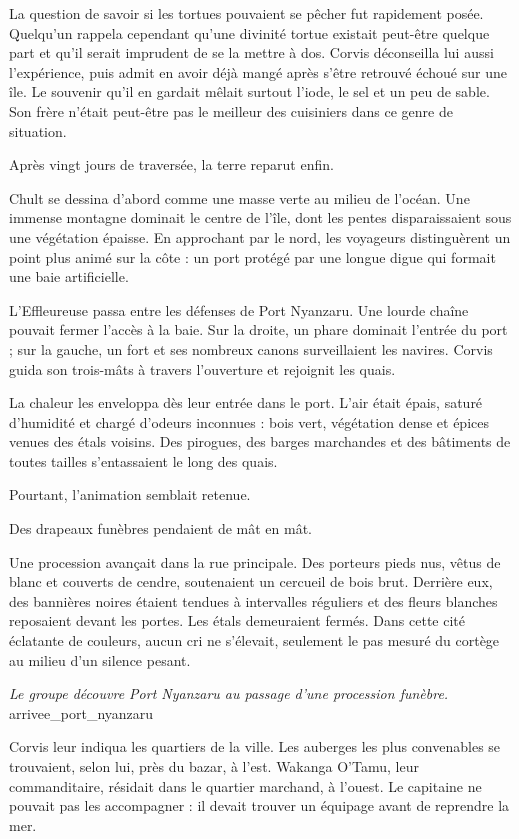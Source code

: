 La question de savoir si les tortues pouvaient se pêcher fut rapidement posée. Quelqu'un rappela cependant qu'une divinité tortue existait peut-être quelque part et qu'il serait imprudent de se la mettre à dos. Corvis déconseilla lui aussi l'expérience, puis admit en avoir déjà mangé après s'être retrouvé échoué sur une île. Le souvenir qu'il en gardait mêlait surtout l'iode, le sel et un peu de sable. Son frère n'était peut-être pas le meilleur des cuisiniers dans ce genre de situation.

Après vingt jours de traversée, la terre reparut enfin.

\scenebreak

Chult se dessina d'abord comme une masse verte au milieu de l'océan. Une immense montagne dominait le centre de l'île, dont les pentes disparaissaient sous une végétation épaisse. En approchant par le nord, les voyageurs distinguèrent un point plus animé sur la côte : un port protégé par une longue digue qui formait une baie artificielle.

L'Effleureuse passa entre les défenses de Port Nyanzaru. Une lourde chaîne pouvait fermer l'accès à la baie. Sur la droite, un phare dominait l'entrée du port ; sur la gauche, un fort et ses nombreux canons surveillaient les navires. Corvis guida son trois-mâts à travers l'ouverture et rejoignit les quais.

La chaleur les enveloppa dès leur entrée dans le port. L'air était épais, saturé d'humidité et chargé d'odeurs inconnues : bois vert, végétation dense et épices venues des étals voisins. Des pirogues, des barges marchandes et des bâtiments de toutes tailles s'entassaient le long des quais.

Pourtant, l'animation semblait retenue.

Des drapeaux funèbres pendaient de mât en mât.

Une procession avançait dans la rue principale. Des porteurs pieds nus, vêtus de blanc et couverts de cendre, soutenaient un cercueil de bois brut. Derrière eux, des bannières noires étaient tendues à intervalles réguliers et des fleurs blanches reposaient devant les portes. Les étals demeuraient fermés. Dans cette cité éclatante de couleurs, aucun cri ne s'élevait, seulement le pas mesuré du cortège au milieu d'un silence pesant.

{\textit{Le groupe découvre Port Nyanzaru au passage d'une procession funèbre.}}
{arrivee_port_nyanzaru}

Corvis leur indiqua les quartiers de la ville. Les auberges les plus convenables se trouvaient, selon lui, près du bazar, à l'est. Wakanga O'Tamu, leur commanditaire, résidait dans le quartier marchand, à l'ouest. Le capitaine ne pouvait pas les accompagner : il devait trouver un équipage avant de reprendre la mer.

